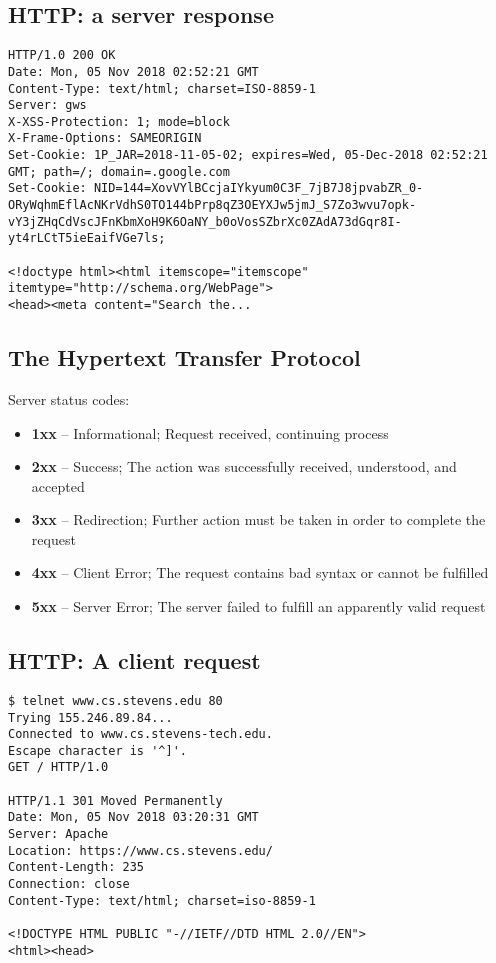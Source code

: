 \documentclass[xga]{xdvislides}
\begin{document}
\subsection{HTTP: a server response}
\begin{verbatim}
HTTP/1.0 200 OK
Date: Mon, 05 Nov 2018 02:52:21 GMT
Content-Type: text/html; charset=ISO-8859-1
Server: gws
X-XSS-Protection: 1; mode=block
X-Frame-Options: SAMEORIGIN
Set-Cookie: 1P_JAR=2018-11-05-02; expires=Wed, 05-Dec-2018 02:52:21 GMT; path=/; domain=.google.com
Set-Cookie: NID=144=XovVYlBCcjaIYkyum0C3F_7jB7J8jpvabZR_0-ORyWqhmEflAcNKrVdhS0TO144bPrp8qZ3OEYXJw5jmJ_S7Zo3wvu7opk-vY3jZHqCdVscJFnKbmXoH9K6OaNY_b0oVosSZbrXc0ZAdA73dGqr8I-yt4rLCtT5ieEaifVGe7ls;

<!doctype html><html itemscope="itemscope" itemtype="http://schema.org/WebPage">
<head><meta content="Search the...
\end{verbatim}

\subsection{The Hypertext Transfer Protocol}
Server status codes:
\begin{itemize}
	\item {\bf 1xx} -- Informational; Request received, continuing process
	\item {\bf 2xx} -- Success; The action was successfully received,
        understood, and accepted
	\item {\bf 3xx} -- Redirection; Further action must be taken in order to
        complete the request
	\item {\bf 4xx} -- Client Error; The request contains bad syntax or
		cannot be fulfilled
	\item {\bf 5xx} -- Server Error; The server failed to fulfill an
		apparently valid request
\end{itemize}

\subsection{HTTP: A client request}
\smallish
\begin{verbatim}
$ telnet www.cs.stevens.edu 80
Trying 155.246.89.84...
Connected to www.cs.stevens-tech.edu.
Escape character is '^]'.
GET / HTTP/1.0

HTTP/1.1 301 Moved Permanently
Date: Mon, 05 Nov 2018 03:20:31 GMT
Server: Apache
Location: https://www.cs.stevens.edu/
Content-Length: 235
Connection: close
Content-Type: text/html; charset=iso-8859-1

<!DOCTYPE HTML PUBLIC "-//IETF//DTD HTML 2.0//EN">
<html><head>
\end{verbatim}
\Normalsize
\end{document}
